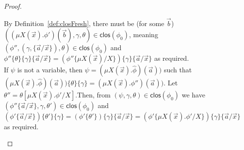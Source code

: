\documentclass[10pt,a4paper]{article}
\theoremstyle{definition}
\theoremstyle{remark}
\newcommand{\clos}[0]{\mathsf{clos}}
\begin{document}
\begin{proof}
\begin{enumerate}
\begin{itemize}
			By Definition~\ref{def:closFresh}, there must be (for some $\vec b$) $((\mu X(\vec x).\phi')(\vec b),\gamma, \theta) \in \clos(\phi_0)$, meaning $(\phi'',(\gamma, \{\vec a / \vec x\}), \theta) \in \clos(\phi_0)$ and $\phi''\{\theta\}\{\gamma\}\{\vec a / \vec x\} = (\phi''\{\mu X(\vec x) / X\})\{\gamma\}\{\vec a / \vec x\}$ as required.
			\\
			If $\psi$ is not a variable, then $\psi = (\mu X(\vec x).\hat \phi)(\vec a))$ such that $ (\mu X(\vec x).\hat \phi)(\vec a))\{\theta\}\{\gamma\} =  (\mu X(\vec x).\phi'')(\vec a))$. 
			Let $\theta'' = \theta[\mu X(\vec x).\phi' / X]$.Then, from $(\psi,\gamma, \theta) \in \clos(\phi_0)$ we have $(\phi''\{\vec a/ \vec x\}, \gamma,\theta') \in \clos(\phi_0)$ and $(\phi'\{\vec a/ \vec x\})\{\theta'\}\{\gamma\} = (\phi'\{\theta'\})\{\gamma\}\{\vec a/ \vec x\} = (\phi'\{\mu X(\vec x).\phi' / X\})\{\gamma\}\{\vec a / \vec x\}$ as required.
			

\end{itemize}
\end{enumerate}
\end{proof}
\end{document}
